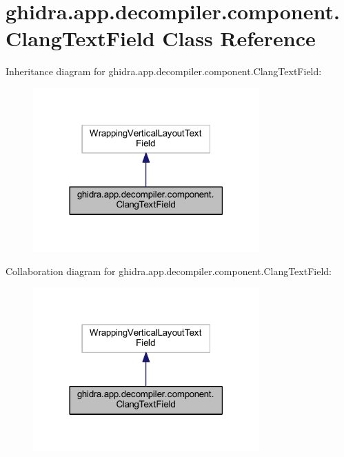 \hypertarget{classghidra_1_1app_1_1decompiler_1_1component_1_1_clang_text_field}{}\section{ghidra.\+app.\+decompiler.\+component.\+Clang\+Text\+Field Class Reference}
\label{classghidra_1_1app_1_1decompiler_1_1component_1_1_clang_text_field}


Inheritance diagram for ghidra.\+app.\+decompiler.\+component.\+Clang\+Text\+Field\+:
\nopagebreak
\begin{figure}[H]
\begin{center}
\leavevmode
\includegraphics[width=246pt]{classghidra_1_1app_1_1decompiler_1_1component_1_1_clang_text_field__inherit__graph}
\end{center}
\end{figure}


Collaboration diagram for ghidra.\+app.\+decompiler.\+component.\+Clang\+Text\+Field\+:
\nopagebreak
\begin{figure}[H]
\begin{center}
\leavevmode
\includegraphics[width=246pt]{classghidra_1_1app_1_1decompiler_1_1component_1_1_clang_text_field__coll__graph}
\end{center}
\end{figure}
